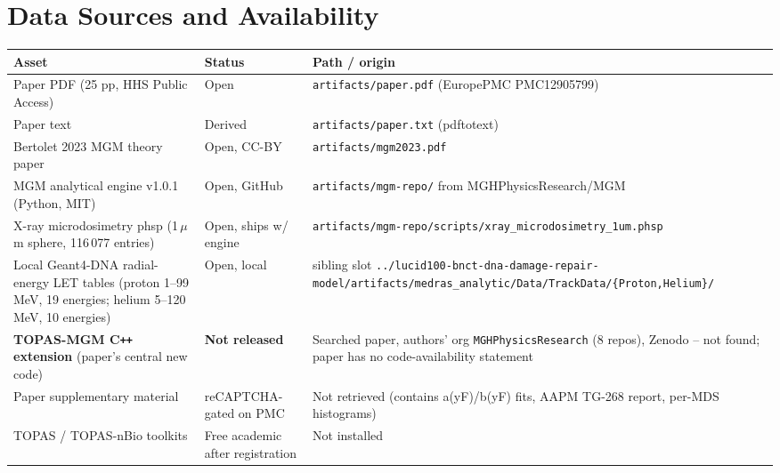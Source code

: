 \documentclass[11pt]{article}
\begin{document}
\section{Data Sources and Availability}
\begin{longtable}{p{5cm}p{2.5cm}p{7cm}}
\toprule
Asset & Status & Path / origin \\
\midrule
Paper PDF (25 pp, HHS Public Access) & Open & \texttt{artifacts/paper.pdf} (EuropePMC PMC12905799) \\
Paper text & Derived & \texttt{artifacts/paper.txt} (pdftotext) \\
Bertolet 2023 MGM theory paper & Open, CC-BY & \texttt{artifacts/mgm2023.pdf} \\
MGM analytical engine v1.0.1 (Python, MIT) & Open, GitHub & \texttt{artifacts/mgm-repo/} from MGHPhysicsResearch/MGM \\
X-ray microdosimetry phsp (1\,$\mu$m sphere, 116\,077 entries) & Open, ships w/ engine & \texttt{artifacts/mgm-repo/scripts/xray\_microdosimetry\_1um.phsp} \\
Local Geant4-DNA radial-energy LET tables (proton 1--99 MeV, 19 energies; helium 5--120 MeV, 10 energies) & Open, local & sibling slot \texttt{../lucid100-bnct-dna-damage-repair-model/artifacts/medras\_analytic/Data/TrackData/\{Proton,Helium\}/} \\
\textbf{TOPAS-MGM C\texttt{++} extension} (paper's central new code) & \textbf{Not released} & Searched paper, authors' org \texttt{MGHPhysicsResearch} (8 repos), Zenodo -- not found; paper has no code-availability statement \\
Paper supplementary material & reCAPTCHA-gated on PMC & Not retrieved (contains a(yF)/b(yF) fits, AAPM TG-268 report, per-MDS histograms) \\
TOPAS / TOPAS-nBio toolkits & Free academic after registration & Not installed \\
\bottomrule
\end{longtable}
\end{document}
